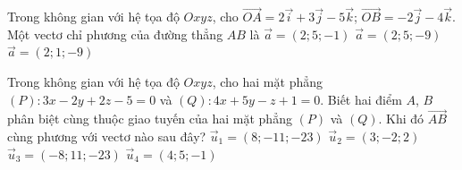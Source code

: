 \begin{ex}%
	Trong không  gian với hệ tọa độ $Oxyz$, cho $\overrightarrow{OA}=2\overrightarrow{i}+3\overrightarrow{j}-5\overrightarrow{k}$; $\overrightarrow{OB}=-2\overrightarrow{j}-4\overrightarrow{k}$. Một vectơ chỉ phương của đường thẳng $AB$ là
		{\True $\overrightarrow{a}=(2;5;-1)$} 
		 {$\overrightarrow{a}=(2;5;-9)$}
		{$\overrightarrow{a}=(2;1;-9)$} 
\end{ex}

\begin{ex}%
	Trong  không gian với hệ tọa độ $Oxyz$, cho hai mặt phẳng $(P)\colon 3x-2y+2z-5=0$ và $(Q)\colon 4x+5y-z+1=0$. Biết hai điểm $A$, $B$ phân biệt cùng thuộc giao tuyến của hai mặt phẳng $(P)$ và $(Q)$. Khi đó $\overrightarrow{AB}$ cùng phương với vectơ nào sau đây?
	\choice 
		{\True  $\overrightarrow{u}_1=(8;-11;-23)$}
		{$\overrightarrow{u}_2=(3;-2;2)$} 
		{$\overrightarrow{u}_3=(-8;11;-23)$} 
		{$\overrightarrow{u}_4=(4;5;-1)$} 
\end{ex}



